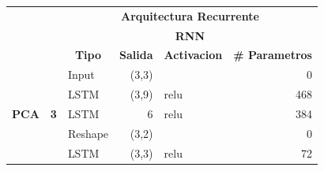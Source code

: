 \begin{table}[]
\centering
\begin{center}
\begin{tabular}{ll|l|r|l|r|}
\cline{3-6}
                                                    &                             & \multicolumn{4}{c|}{\textbf{Arquitectura Recurrente}}                                                                                                           \\ \cline{3-6} 
                                                    &                             & \multicolumn{4}{c|}{\textbf{RNN}}                                                                                                                                  \\ \cline{3-6} 
                                                    &                             & \multicolumn{1}{c|}{\textbf{Tipo}} & \multicolumn{1}{c|}{\textbf{Salida}} & \multicolumn{1}{c|}{\textbf{Activacion}} & \multicolumn{1}{l|}{\textbf{\# Parametros}} \\ \hline
\multicolumn{1}{|l|}{\multirow{7}{*}{\textbf{PCA}}} & \multirow{7}{*}{\textbf{3}} & Input                              & (3,3)                                &                                          & 0                                           \\ \cline{3-6} 
\multicolumn{1}{|l|}{}                              &                             & LSTM                               & (3,9)                                & relu                                     & 468                                         \\ \cline{3-6} 
\multicolumn{1}{|l|}{}                              &                             & LSTM                               & 6                                    & relu                                     & 384                                         \\ \cline{3-6} 
\multicolumn{1}{|l|}{}                              &                             & Reshape                            & (3,2)                                &                                          & 0                                           \\ \cline{3-6} 
\multicolumn{1}{|l|}{}                              &                             & LSTM                               & (3,3)                                & relu                                     & 72                                          \\ \cline{3-6} 

\end{tabular}
\end{center}
\end{table}
